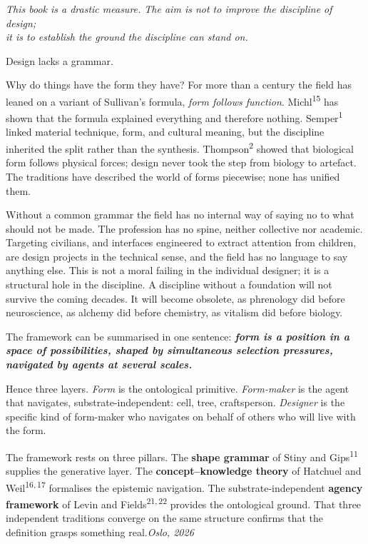 \begin{widebody}
\begin{foreordbody}

\begin{center}\itshape
This book is a drastic measure. The aim is not to improve the discipline of design;\\ it is to establish the ground the discipline can stand on.
\end{center}

Design lacks a grammar.

Why do things have the form they have? For more than a century the field has leaned on a variant of Sullivan's formula, \textit{form follows function}. Michl\textsuperscript{15} has shown that the formula explained everything and therefore nothing. Semper\textsuperscript{1} linked material technique, form, and cultural meaning, but the discipline inherited the split rather than the synthesis. Thompson\textsuperscript{2} showed that biological form follows physical forces; design never took the step from biology to artefact. The traditions have described the world of forms piecewise; none has unified them.

Without a common grammar the field has no internal way of saying no to what should not be made. The profession has no spine, neither collective nor academic. Targeting civilians, and interfaces engineered to extract attention from children, are design projects in the technical sense, and the field has no language to say anything else. This is not a moral failing in the individual designer; it is a structural hole in the discipline. A discipline without a foundation will not survive the coming decades. It will become obsolete, as phrenology did before neuroscience, as alchemy did before chemistry, as vitalism did before biology.

The framework can be summarised in one sentence: \textbf{\textit{form is a position in a space of possibilities, shaped by simultaneous selection pressures, navigated by agents at several scales.}}

Hence three layers. \textit{Form} is the ontological primitive. \textit{Form-maker} is the agent that navigates, substrate-independent: cell, tree, craftsperson. \textit{Designer} is the specific kind of form-maker who navigates on behalf of others who will live with the form.

The framework rests on three pillars. The \textbf{shape grammar} of Stiny and Gips\textsuperscript{11} supplies the generative layer. The \textbf{concept--knowledge theory} of Hatchuel and Weil\textsuperscript{16,\,17} formalises the epistemic navigation. The substrate-independent \textbf{agency framework} of Levin and Fields\textsuperscript{21,\,22} provides the ontological ground. That three independent traditions converge on the same structure confirms that the definition grasps something real.\hfill\textit{Oslo, 2026}
\end{foreordbody}
\end{widebody}
